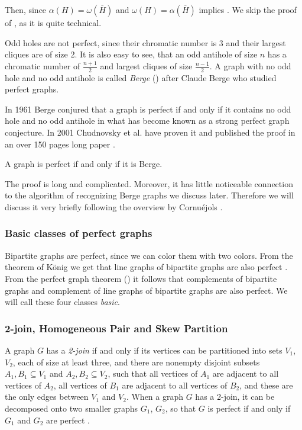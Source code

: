 
Then, since $\alpha(H) = \omega(\overline{H})$ and $\omega(H) = \alpha(\overline{H})$  implies . We skip the proof of , as it is quite technical.

Odd holes are not perfect, since their chromatic number is 3 and their largest cliques are of size 2. It is also easy to see, that an odd antihole of size $n$ has a chromatic number of $\frac{n+1}{2}$ and largest cliques of size $\frac{n-1}{2}$. A graph with no odd hole and no odd antihole is called \emph{Berge} () after Claude Berge who studied perfect graphs.

In 1961 Berge conjured that a graph is perfect if and only if it contains no odd hole and no odd antihole in what has become known as a strong perfect graph conjecture. In 2001 Chudnovsky et al. have proven it and published the proof in an over 150 pages long paper  \cite{MC06}.

\begin{theorem}
	\label{thm:spgt}
	A graph is perfect if and only if it is Berge.
\end{theorem}

The proof is long and complicated. Moreover, it has little noticeable connection to the algorithm of recognizing Berge graphs we discuss later. Therefore we will discuss it very briefly following the overview by Cornuéjols \cite{GC03}.

\subsubsection{Basic classes of perfect graphs}
Bipartite graphs are perfect, since we can color them with two colors. From the theorem of König \cite{Knig1916} we get that line graphs of bipartite graphs are also perfect \cite{GC03}. From the perfect graph theorem () it follows that complements of bipartite graphs and complement of line graphs of bipartite graphs are also perfect. We will call these four classes \emph{basic}.

\subsubsection{2-join, Homogeneous Pair and Skew Partition}
A graph $G$ has a \emph{2-join} if and only if its vertices can be partitioned into sets $V_1$, $V_2$, each of size at least three, and there are nonempty disjoint subsets $A_1, B_1 \subseteq V_1$ and $A_2, B_2 \subseteq V_2$, such that all vertices of $A_1$ are adjacent to all vertices of $A_2$, all vertices of $B_1$ are adjacent to all vertices of $B_2$, and these are the only edges between $V_1$ and $V_2$. When a graph $G$ has a 2-join, it can be decomposed onto two smaller graphs $G_1$, $G_2$, so that $G$ is perfect if and only if $G_1$ and $G_2$ are perfect \cite{Cornujols1985}.

